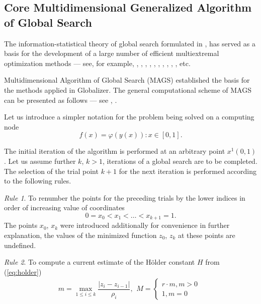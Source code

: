 \documentclass{gOMS2e}
\theoremstyle{plain}%
\theoremstyle{definition}
\theoremstyle{remark}
\begin{document}
\subsection{Core Multidimensional Generalized Algorithm of Global Search}
\label{subsec:corepar}
The information-statistical theory of global search formulated in \cite{strongin1978}, \cite{strSergGO}
has served as a basis for the development of a large number of efficient multiextremal
optimization methods --- see, for example, \cite{gergel1996}, \cite{gergel1997},
\cite{gergelStrongin2003}, \cite{gergelStrongin2005}, \cite{grishaginStrongin1984},
\cite{sergeyev1995}, \cite{sergeyev1999}, \cite{sergeyevGrishagin1994}, \cite{sergeyevGrishagin2001}
\cite{sergeyevStronginLera2013}, \cite{barkalovGergel2014}, etc.
\par
Multidimensional Algorithm of Global Search (MAGS) established the basis for the
methods applied in Globalizer. The general computational scheme of MAGS can be
presented as follows --- see \cite{strongin1978}, \cite{strSergGO}.
\par
Let us introduce a simpler notation for the problem being solved on a computing node
\begin{equation}
\label{eq:oneDimFunc}
f(x) = \varphi(y(x)):x\in [0,1].
\end{equation}
\par
The initial iteration of the algorithm is performed at an arbitrary point \(x^1(0,1)\).
Let us assume further \(k\), \(k>1\), iterations of a global search are to be completed.
The selection of the trial point \(k+1\) for the next iteration is performed according to the following rules.
\par
\textit{Rule 1}. To renumber the points for the preceding trials by the lower indices in order of increasing value of coordinates
\begin{equation}
  \label{step1}
0=x_0<x_1<\dotsc<x_{k+1}=1.
\end{equation}
The points \(x_0\), \(x_k\) were introduced additionally for convenience in further explanation,
the values of the minimized function \(z_0\), \(z_k\) at these points are undefined.
\par
\textit{Rule 2}. To compute a current estimate of the H{\"o}lder constant \(H\) from (\ref{eq:holder})
\begin{equation}
  \label{step2}
m=\max_{1\leqslant i\leqslant k}\dfrac{|z_i-z_{i-1}|}{\rho_i},
\begin{matrix}
    M =
    \left\{
    \begin{matrix}
    r\cdot m,m>0 \\
    1,m=0
    \end{matrix} \right.
    \end{matrix}
\end{equation}
\end{document}
